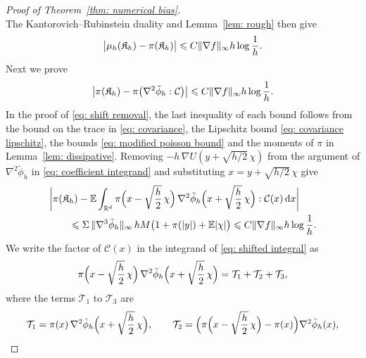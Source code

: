 \begin{proof}[Proof of Theorem~\ref{thm: numerical bias}]
\begin{equation*}
    \end{equation*}
    The Kantorovich--Rubinstein duality and Lemma~\ref{lem: rough} then give
    \begin{equation}
        \bigl| \mu_h(\mathfrak K_h) - \pi(\mathfrak K_h) \bigr| \leqslant C \lVert \nabla f \rVert_\infty h \log\frac1h .
        \label{eq: measure replacement}
    \end{equation}
    Next we prove
    \begin{equation}
        \bigl| \pi(\mathfrak K_h) - \pi\bigl( \nabla^2 \tilde\phi_h : \mathcal C \bigr) \bigr| \leqslant C \lVert \nabla f \rVert_\infty h \log\frac1h .
        \label{eq: shift removal}
    \end{equation}
    In the proof of \eqref{eq: shift removal}, the last inequality of each bound follows from the bound on the trace in \eqref{eq: covariance}, the Lipschitz bound \eqref{eq: covariance lipschitz}, the bounds \eqref{eq: modified poisson bound} and the moments of $\pi$ in Lemma~\ref{lem: dissipative}. Removing $-h\, \nabla U( y + \sqrt{h/2}\, \chi )$ from the argument of $\nabla^2 \tilde\phi_h$ in \eqref{eq: coefficient integrand} and substituting $x = y + \sqrt{h/2}\, \chi$ give
    \begin{equation}
    \begin{aligned}
        & \biggl| \pi(\mathfrak K_h) - \mathbb E \int_{\mathbb R^d} \pi\Bigl( x - \sqrt{\frac h2}\, \chi \Bigr)\, \nabla^2 \tilde\phi_h\Bigl( x + \sqrt{\frac h2}\, \chi \Bigr) : \mathcal C(x)\, \mathrm{d} x \biggr| \\
        & \qquad \leqslant \Sigma\, \lVert \nabla^3 \tilde\phi_h \rVert_\infty\, h M \bigl( 1 + \pi(|y|) + \mathbb E |\chi| \bigr) \leqslant C \lVert \nabla f \rVert_\infty h \log\frac1h .
    \end{aligned}
        \label{eq: shifted integral}
    \end{equation}
    We write the factor of $\mathcal C(x)$ in the integrand of \eqref{eq: shifted integral} as
    \begin{equation*}
        \pi\Bigl( x - \sqrt{\frac h2}\, \chi \Bigr)\, \nabla^2 \tilde\phi_h\Bigl( x + \sqrt{\frac h2}\, \chi \Bigr) = \mathcal T_1 + \mathcal T_2 + \mathcal T_3 ,
    \end{equation*}
    where the terms $\mathcal T_1$ to $\mathcal T_3$ are
    \begin{equation*}
    \begin{gathered}
        \mathcal T_1 = \pi(x)\, \nabla^2 \tilde\phi_h\Bigl( x + \sqrt{\frac h2}\, \chi \Bigr) , \qquad
        \mathcal T_2 = \Bigl( \pi\Bigl( x - \sqrt{\frac h2}\, \chi \Bigr) - \pi(x) \Bigr) \nabla^2 \tilde\phi_h(x) , \\

\end{gathered}
\end{equation*}
\end{proof}
